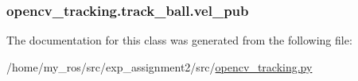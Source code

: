 \subsubsection[{\texorpdfstring{vel\+\_\+pub}{vel_pub}}]{\setlength{\rightskip}{0pt plus 5cm}opencv\+\_\+tracking.\+track\+\_\+ball.\+vel\+\_\+pub}\hypertarget{classopencv__tracking_1_1track__ball_a09ab81e992a70d22568ed1f6c556d1bb}{}\label{classopencv__tracking_1_1track__ball_a09ab81e992a70d22568ed1f6c556d1bb}


The documentation for this class was generated from the following file\+:\begin{DoxyCompactItemize}
\item 
/home/my\+\_\+ros/src/exp\+\_\+assignment2/src/\hyperlink{opencv__tracking_8py}{opencv\+\_\+tracking.\+py}\end{DoxyCompactItemize}
